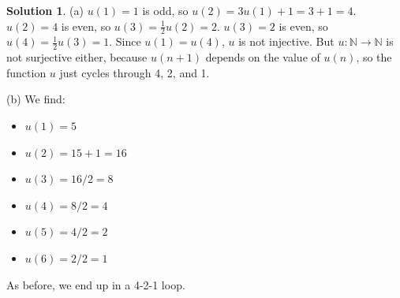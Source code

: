 \documentclass{article}
\numberwithin{equation}{section}
\theoremstyle{plain}
\theoremstyle{definition}
\newtheorem*{solution*}{Solution}
\newcommand{\N}{\mathbb N}
\begin{document}
\begin{solution*}
	(a) $u(1) = 1$ is odd, so $u(2) = 3u(1) + 1 = 3 + 1 = 4$. $u(2) = 4$ is even, so $u(3) = \frac 1 2 u(2) = 2$. $u(3) = 2$ is even, so $u(4) = \frac 1 2 u(3) = 1$. Since $u(1) = u(4)$, $u$ is not injective. But $u : \N\to \N$ is not surjective either, because $u(n+1)$ depends on the value of $u(n)$, so the function $u$ just cycles through 4, 2, and 1. 
	
	(b) We find: 
	\begin{itemize}
		\item $u(1) = 5$
		\item $u(2) = 15 + 1 = 16$
		\item $u(3) = 16/2 = 8$
		\item $u(4) = 8/2 = 4$
		\item $u(5) = 4/2 = 2$
		\item $u(6) = 2/2 = 1$
	\end{itemize}
	As before, we end up in a 4-2-1 loop. 
	

\end{solution*}
\end{document}
